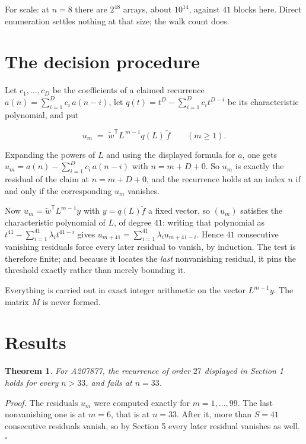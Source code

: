 \documentclass[11pt]{article}
\newtheorem{theorem}{Theorem}
\theoremstyle{definition}
\begin{document}
For scale: at $n = 8$ there are $2^{48}$ arrays, about $10^{14}$, against $41$ blocks here. Direct enumeration settles nothing at that size; the walk count does.

\section{The decision procedure}

Let $c_1,\dots,c_D$ be the coefficients of a claimed recurrence $a(n) = \sum_{i=1}^{D} c_i\,a(n-i)$, let $q(t) = t^{D} - \sum_{i=1}^{D} c_i t^{D-i}$ be its characteristic polynomial, and put

\[u_m \;=\; \tilde w^{\mathsf T} L^{\,m-1} q(L)\,\tilde f \qquad (m \ge 1).\]

Expanding the powers of $L$ and using the displayed formula for $a$, one gets $u_m = a(n) - \sum_{i=1}^{D} c_i\,a(n-i)$ with $n = m + D + 0$. So $u_m$ is exactly the residual of the claim at $n = m + D + 0$, and the recurrence holds at an index $n$ if and only if the corresponding $u_m$ vanishes.

Now $u_m = \tilde w^{\mathsf T} L^{m-1} y$ with $y = q(L)\tilde f$ a fixed vector, so $(u_m)$ satisfies the characteristic polynomial of $L$, of degree $41$: writing that polynomial as $t^{41} - \sum_{i=1}^{41} \lambda_i t^{41-i}$ gives $u_{m+41} = \sum_{i=1}^{41} \lambda_i u_{m+41-i}$. Hence $41$ consecutive vanishing residuals force every later residual to vanish, by induction. The test is therefore finite; and because it locates the {\itshape last} nonvanishing residual, it pins the threshold exactly rather than merely bounding it.

Everything is carried out in exact integer arithmetic on the vector $L^{m-1}y$. The matrix $M$ is never formed.

\section{Results}

\begin{theorem} For A207877, the recurrence of order $27$ displayed in Section 1 holds for every $n > 33$, and fails at $n = 33$.\end{theorem}

{\itshape Proof.} The residuals $u_m$ were computed exactly for $m = 1,\dots,99$. The last nonvanishing one is at $m = 6$, that is at $n = 33$. After it, more than $S = 41$ consecutive residuals vanish, so by Section 5 every later residual vanishes as well. $\square$
\end{document}
